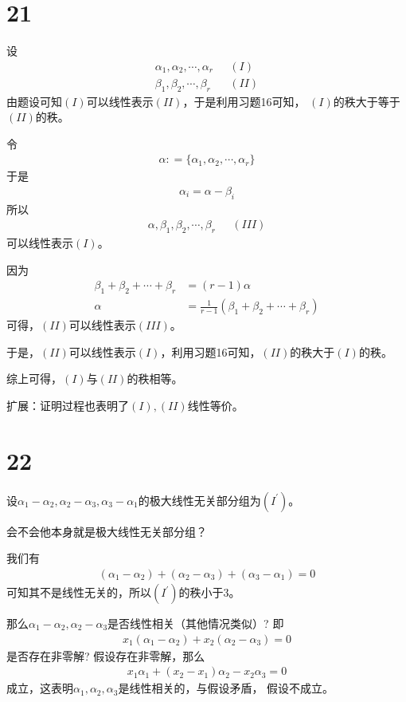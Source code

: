 \documentclass{article}
\begin{document}
\section*{21}

设
\begin{align*}
  \alpha_1, \alpha_2, \cdots, \alpha_r \ \ \  & (I)  \\
  \beta_1, \beta_2, \cdots, \beta_r \ \ \     & (II)
\end{align*}
由题设可知$(I)$可以线性表示$(II)$，于是利用习题16可知，
$(I)$的秩大于等于$(II)$的秩。

令
\begin{align*}
  \alpha : = \{ \alpha_1, \alpha_2, \cdots, \alpha_r\}
\end{align*}
于是
\begin{align*}
  \alpha_i = \alpha - \beta_i
\end{align*}
所以
\begin{align*}
  \alpha, \beta_1, \beta_2, \cdots, \beta_r \ \ \  & (III)
\end{align*}
可以线性表示$(I)$。

因为
\begin{align*}
  \beta_1 + \beta_2 + \cdots + \beta_r & = (r - 1) \alpha                                        \\
  \alpha                               & = \frac{1}{r - 1}(\beta_1 + \beta_2 + \cdots + \beta_r)
\end{align*}
可得，$(II)$可以线性表示$(III)$。

于是，$(II)$可以线性表示$(I)$，利用习题16可知，$(II)$的秩大于$(I)$的秩。

综上可得，$(I)$与$(II)$的秩相等。

扩展：证明过程也表明了$(I), (II)$线性等价。

\section*{22}

设$\alpha_1 - \alpha_2, \alpha_2 - \alpha_3, \alpha_3 - \alpha_1$的极大线性无关部分组为$(I^\prime)$。

会不会他本身就是极大线性无关部分组？

我们有
\begin{align*}
  (\alpha_1 - \alpha_2) + (\alpha_2 - \alpha_3) + (\alpha_3 - \alpha_1) = 0
\end{align*}
可知其不是线性无关的，所以$(I^\prime)$的秩小于$3$。

那么$\alpha_1 - \alpha_2, \alpha_2 - \alpha_3$是否线性相关（其他情况类似）?
即
\begin{align*}
  x_1(\alpha_1 - \alpha_2) + x_2(\alpha_2 - \alpha_3) = 0
\end{align*}
是否存在非零解? 假设存在非零解，那么
\begin{align*}
  x_1 \alpha_1 + (x_2 - x_1) \alpha_2 - x_2 \alpha_3 = 0
\end{align*}
成立，这表明$\alpha_1, \alpha_2, \alpha_3$是线性相关的，与假设矛盾，
假设不成立。
\end{document}
